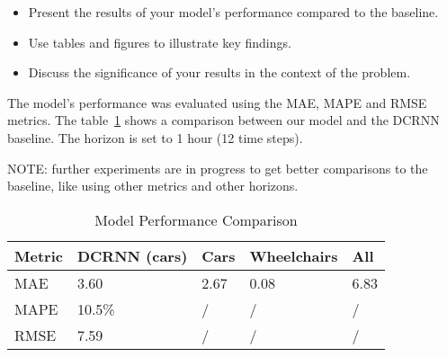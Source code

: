 \begin{itemize}
    \item Present the results of your model's performance compared to the baseline.
    \item Use tables and figures to illustrate key findings.
    \item Discuss the significance of your results in the context of the problem.
\end{itemize}

The model's performance was evaluated using the MAE, MAPE and RMSE metrics.
The table~\ref{tab:model_performance_comparison} shows a comparison between our model and the DCRNN baseline.
The horizon is set to 1 hour (12 time steps).

NOTE: further experiments are in progress to get better comparisons to the baseline, like using other metrics and other horizons.

\begin{table}[htbp]
    \caption{Model Performance Comparison}
    \center
    \begin{tabular}{@{}lllll@{}}
        \toprule
        \textbf{Metric} & \textbf{DCRNN (cars)} & \textbf{Cars} & \textbf{Wheelchairs} & \textbf{All} \\
        \midrule
        MAE             & 3.60                  & 2.67          & 0.08                 & 6.83         \\
        MAPE            & 10.5\%                & /             & /                    & /            \\
        RMSE            & 7.59                  & /             & /                    & /            \\
        \bottomrule
    \end{tabular}
    \label{tab:model_performance_comparison}
\end{table}